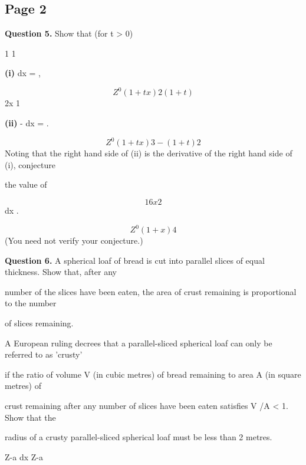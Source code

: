 \documentclass[12pt]{article}
\begin{document}
\subsection*{Page 2}
\begin{flushleft}
\bigskip\textbf{Question 5.} Show that (for t > 0)\par
1 1\par
\textbf{(i)} dx = ,\par
\[Z^0 (1 + tx)2 (1 + t)\]
2x 1\par
\textbf{(ii)} - dx = .\par
\[Z^0 (1 + tx)3 - (1 + t)2\]
Noting that the right hand side of (ii) is the derivative of the right hand side of (i), conjecture\par
the value of\par
\[1 6x2\]
dx .\par
\[Z^0 (1 + x)4\]
(You need not verify your conjecture.)\par
\bigskip\textbf{Question 6.} A spherical loaf of bread is cut into parallel slices of equal thickness. Show that, after any\par
number of the slices have been eaten, the area of crust remaining is proportional to the number\par
of slices remaining.\par
A European ruling decrees that a parallel-sliced spherical loaf can only be referred to as 'crusty'\par
if the ratio of volume V (in cubic metres) of bread remaining to area A (in square metres) of\par
crust remaining after any number of slices have been eaten satisfies V /A < 1. Show that the\par
radius of a crusty parallel-sliced spherical loaf must be less than 2 metres.\par
[The area A and volume V formed by rotating a curve in the x-y plane round the x-axis from\par
\[x = a to x = a + t are given by\]
- -\par
-a+t\par
dy 2\par
-a+t\par
\[A = 2\pi y 1 + dx , V = \pi y dx . ]\]
Z-a \lambda \gamma dx \delta \mu Z-a\par
\end{flushleft}
\end{document}
